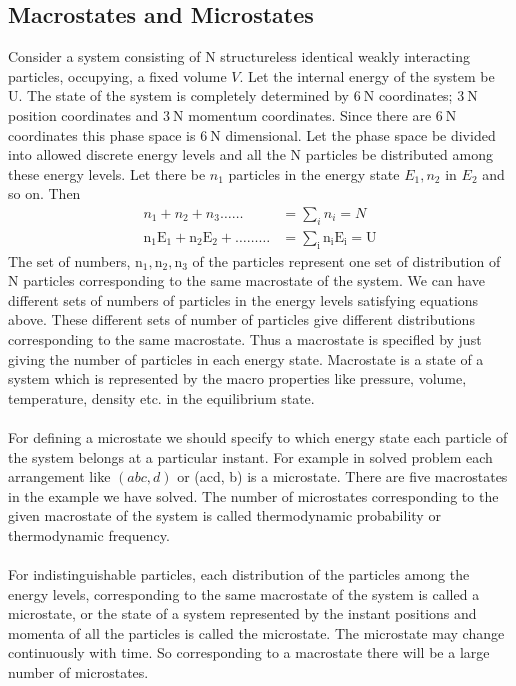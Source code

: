 \subsection{Macrostates and Microstates}
\par Consider a system consisting of $\mathrm{N}$ structureless identical weakly interacting particles, occupying, a fixed volume $V$. Let the internal energy of the system be U. The state of the system is completely determined by $6 \mathrm{~N}$ coordinates; $3 \mathrm{~N}$ position coordinates and $3 \mathrm{~N}$ momentum coordinates. Since there are $6 \mathrm{~N}$ coordinates this phase space is $6 \mathrm{~N}$ dimensional. Let the phase space be divided into allowed discrete energy levels and all the $\mathrm{N}$ particles be distributed among these energy levels. Let there be $n_{1}$ particles in the energy state $E_{1}, n_{2}$ in $E_{2}$ and so on. Then
\begin{align*}
n_{1}+n_{2}+n_{3} \ldots \ldots&=\sum_{i} n_{i}=N\\
\mathrm{n}_{1} \mathrm{E}_{1}+\mathrm{n}_{2} \mathrm{E}_{2}+\ldots \ldots \ldots&=\sum_{\mathrm{i}} \mathrm{n}_{\mathrm{i}} \mathrm{E}_{\mathrm{i}}=\mathrm{U}
\end{align*}
 The set of numbers, $\mathrm{n}_{1}, \mathrm{n}_{2}, \mathrm{n}_{3}$ of the particles represent one set of distribution of $\mathrm{N}$ particles corresponding to the same macrostate of the system. We can have different sets of numbers of particles in the energy levels satisfying equations above. These different sets of number of particles give different distributions corresponding to the same macrostate. Thus a macrostate is specifled by just giving the number of particles in each energy state. Macrostate is a state of a system which is represented by the macro properties like pressure, volume, temperature, density etc. in the equilibrium state.\\\\
For defining a microstate we should specify to which energy state each particle of the system belongs at a particular instant. For example in solved problem each arrangement like $(a b c, d)$ or (acd, b) is a microstate. There are five macrostates in the example we have solved. The number of microstates corresponding to the given macrostate of the system is called thermodynamic probability or thermodynamic frequency.\\\\
For indistinguishable particles, each distribution of the particles among the energy levels, corresponding to the same macrostate of the system is called a microstate, or the state of a system represented by the instant positions and momenta of all the particles is called the microstate. The microstate may change continuously with time. So corresponding to a macrostate there will be a large number of microstates.
